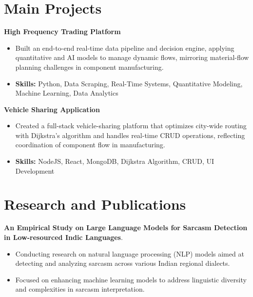 \documentclass[a4paper,11pt]{article}
\begin{document}
\section{\textbf{Main Projects}}

\vspace{1mm}
  \textbf{High Frequency Trading Platform  }
\vspace{-1.5mm} %
\begin{itemize}
  \item Built an end-to-end real-time data pipeline and decision engine, applying quantitative and AI models to manage dynamic flows, mirroring material-flow planning challenges in component manufacturing.
\vspace{-3mm}
  \item \textbf{Skills:} Python, Data Scraping, Real-Time Systems, Quantitative Modeling, Machine Learning, Data Analytics
\end{itemize}


\vspace{1mm}
   \textbf{Vehicle Sharing Application }
\vspace{-1.5mm} %
\begin{itemize}
  \item Created a full-stack vehicle-sharing platform that optimizes city-wide routing with Dijkstra's algorithm and handles real-time CRUD operations, reflecting coordination of component flow in manufacturing.
\vspace{-3mm}
  \item \textbf{Skills:} NodeJS, React, MongoDB, Dijkstra Algorithm, CRUD, UI Development
\end{itemize}



\section{\textbf{Research and Publications} \hfill }
\vspace{1mm}
  \textbf{An Empirical Study on Large Language Models for Sarcasm Detection in Low-resourced Indic Languages}.
\vspace{-1mm} %
\begin{itemize}
  \item Conducting research on natural language processing (NLP) models aimed at detecting and analyzing sarcasm across various Indian regional dialects.
\vspace{-3mm}
  \item Focused on enhancing machine learning models to address linguistic diversity and complexities in sarcasm interpretation.
\end{itemize}
\end{document}
